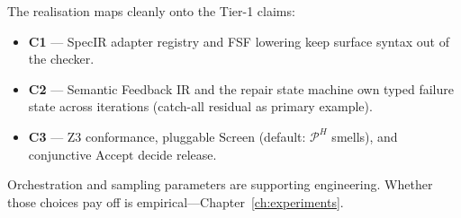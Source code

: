 The realisation maps cleanly onto the Tier-1 claims:
\begin{itemize}
  \item \textbf{C1} --- SpecIR adapter registry and FSF lowering keep surface
        syntax out of the checker.
  \item \textbf{C2} --- Semantic Feedback IR and the repair state machine own
        typed failure state across iterations (catch-all residual as primary
        example).
  \item \textbf{C3} --- Z3 conformance, pluggable $\mathrm{Screen}$
        (default: $\mathcal{P}^H$ smells), and conjunctive $\mathrm{Accept}$
        decide release.
\end{itemize}
Orchestration and sampling parameters are supporting engineering.
Whether those choices pay off is empirical---Chapter~\ref{ch:experiments}.
